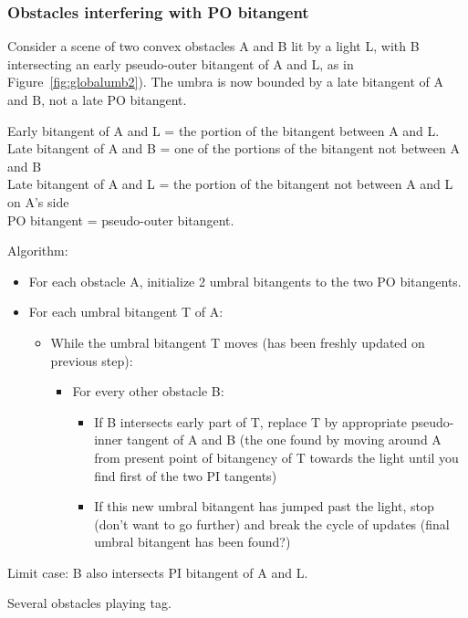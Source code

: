 \documentclass[12pt]{article}
\begin{document}
\subsubsection{Obstacles interfering with PO bitangent}

Consider a scene of two convex obstacles A and B lit by a light L,
with B intersecting an early pseudo-outer bitangent of A and L, as
in Figure~\ref{fig:globalumb2}).
The umbra is now bounded by a late bitangent of A and B, 
not a late PO bitangent.

\begin{defn2}
Early bitangent of A and L = the portion of the bitangent between A and L.
Late bitangent of A and B = one of the portions of the bitangent 
			    not between A and B\\
Late bitangent of A and L = the portion of the bitangent not between A and L
				 on A's side	\\		  
PO bitangent = pseudo-outer bitangent.
\end{defn2}

Algorithm:
\begin{itemize}
\item For each obstacle A, initialize 2 umbral bitangents to the two PO bitangents.
\item For each umbral bitangent T of A:
\begin{itemize}
\item While the umbral bitangent T moves (has been freshly updated on previous step):
\begin{itemize}
\item For every other obstacle B:
\begin{itemize}
\item If B intersects early part of T, 
	replace T by appropriate pseudo-inner tangent of A and B
	(the one found by moving around A from present point of bitangency of T
	towards the light until you find first of the two PI tangents)
\item If this new umbral bitangent has jumped past the light, 
	stop (don't want to go further)
	and break the cycle of updates (final umbral bitangent has been found?)
\end{itemize}
\end{itemize}
\end{itemize}
\end{itemize}

Limit case: B also intersects PI bitangent of A and L.

Several obstacles playing tag.
\end{document}

